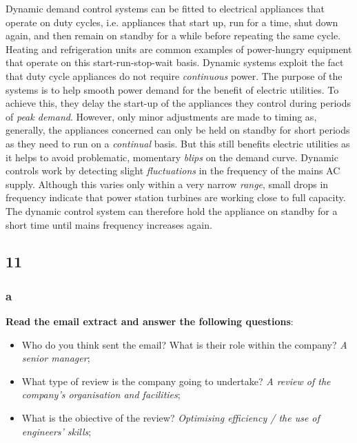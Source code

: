 Dynamic demand control systems can be fitted to electrical appliances that operate on duty cycles, i.e. appliances that start up, run for a time, shut down again, and then remain on standby for a while before repeating the same cycle. Heating and refrigeration units are common examples of power-hungry equipment that operate on this start-run-stop-wait basis.
Dynamic systems exploit the fact that duty cycle appliances do not require \textit{continuous} power. The purpose of the systems is to help smooth power demand for the benefit of electric utilities. To achieve this, they delay the start-up of the appliances they control during periods of \textit{peak demand}. However, only minor adjustments are made to timing as, generally, the appliances concerned can only be held on standby for short periods as they need to run on a \textit{continual} basis. But this still benefits electric utilities as it helps to avoid problematic, momentary \textit{blips} on the demand curve.
Dynamic controls work by detecting slight \textit{fluctuations} in the frequency of the mains AC supply. Although this varies only within a very narrow \textit{range}, small drops in frequency indicate that power station turbines are working close to full capacity. The dynamic control system can therefore hold the appliance on standby for a short time until mains frequency increases again.

\subsection{11}

\subsubsection{a}

\textbf{Read the email extract and answer the following questions}:

\begin{itemize}

\item Who do you think sent the email? What is their role within the company? \textit{A senior manager};
\item What type of review is the company going to undertake? \textit{A review of the company's organisation and facilities};
\item  What is the obiective of the review? \textit{Optimising efficiency / the use of engineers' skills};

\end{itemize}

